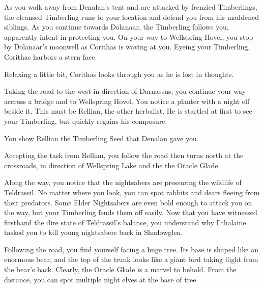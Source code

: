 As you walk away from Denalan's tent and are attacked by frenzied Timberlings, the cleansed Timberling runs to your location and defend you from his maddened siblings. As you continue towards Dolanaar, the Timberling follows you, apparently intent in protecting you. On your way to Wellspring Hovel, you stop by Dolanaar's moonwell as Corithas is waving at you. Eyeing your Timberling, Corithas harbors a stern face.


Relaxing a little bit, Corithas looks through you as he is lost in thoughts.


Taking the road to the west in direction of Darnassus, you continue your way accross a bridge and to Wellspring Hovel. You notice a planter with a night elf beside it. This must be Rellian, the other herbalist. He is startled at first to see your Timberling, but quickly regains his composure.%


You show Rellian the Timberling Seed that Denalan gave you.



Accepting the task from Rellian, you follow the road then turns north at the crossroads, in direction of Wellspring Lake and the the Oracle Glade.

Along the way, you notice that the nightsabers are pressuring the wildlife of Teldrassil. No matter where you look, you can spot rabbits and dears fleeing from their predators. Some Elder Nightsabers are even bold enough to attack you on the way, but your Timberling fends them off easily. Now that you have witnessed firsthand the dire state of Teldrassil's balance, you understand why Ilthalaine tasked you to kill young nightsabers back in Shadowglen.

Following the road, you find yourself facing a huge tree. Its base is shaped like an enormous bear, and the top of the trunk looks like a giant bird taking flight from the bear's back. Clearly, the Oracle Glade is a marvel to behold. From the distance, you can spot multiple night elves at the base of tree.

